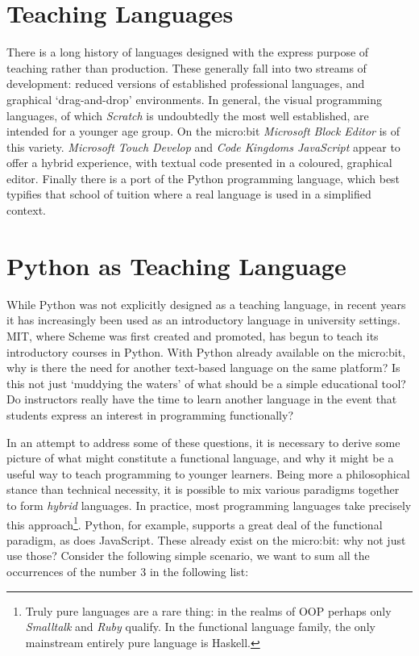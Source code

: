 \documentclass[12pt, a4paper]{report}
\begin{document}
\section{Teaching Languages}
There is a long history of languages designed with the express purpose of teaching rather than
production. These generally fall into two streams of development: reduced versions of established
professional languages, and graphical `drag-and-drop' environments. In general, the visual
programming languages, of which \textit{Scratch} is undoubtedly the most well established, are
intended for a younger age group. On the micro:bit \textit{Microsoft Block Editor} is of this
variety. \textit{Microsoft Touch Develop} and \textit{Code Kingdoms JavaScript} appear to offer a
hybrid experience, with textual code presented in a coloured, graphical editor. Finally there is a
port of the Python programming language, which best typifies that school of tuition where a real
language is used in a simplified context.

\section{Python as Teaching Language}
While Python was not explicitly designed as a teaching language, in recent years it has increasingly
been used as an introductory language in university settings. MIT, where Scheme was first created
and promoted, has begun to teach its introductory courses in Python. With Python already available
on the micro:bit, why is there the need for another text-based language on the same platform? Is
this not just `muddying the waters' of what should be a simple educational tool? Do instructors
really have the time to learn another language in the event that students express an interest in programming
functionally?

In an attempt to address some of these questions, it is necessary to derive some picture of what might
constitute a functional language, and why it might be a useful way to teach programming to younger
learners. Being more a philosophical stance than technical necessity, it is possible to mix various
paradigms together to form \textit{hybrid} languages. In practice, most programming languages take
precisely this approach\footnote{Truly pure languages are a rare thing: in the realms of OOP perhaps
only \textit{Smalltalk} and \textit{Ruby} qualify. In the functional language family, the only
mainstream entirely pure language is Haskell.}. Python, for example, supports a great deal of the 
functional paradigm, as does JavaScript. These already exist on the micro:bit: why not just use those? 
Consider the following simple scenario, we want to sum all the occurrences of the number 3 in the
following list: 
\end{document}
